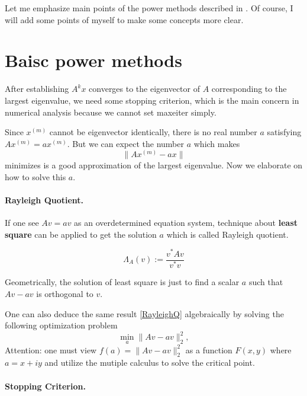 \documentclass[12pt]{article}
\begin{document}
Let me emphasize main points of the power methods described in \cite{borm2012numerical}.
Of course, I will add some points of myself to make some concepts more clear.


\section{Baisc power methods}
After establishing $A^{k}x$ converges to the eigenvector of $A$ corresponding to the largest eigenvalue, 
we need some stopping criterion, which is the main concern in numerical analysis because we cannot set max\textunderscore eiter simply. 

Since $x^{(m)}$ cannot be eigenvector identically, there is no real number $a$ satisfying $Ax^{(m)} = ax^{(m)}$. 
But we can expect the number $a$ which makes
$$
\|A x^{(m)}-ax\| 
$$
minimizes is a good approximation of the largest eigenvalue. Now we elaborate on how to solve this $a$.

\paragraph{Rayleigh Quotient.} If one see $Av = av$ as an overdetermined equation system, technique about \textbf{least square} can be applied
to get the solution $a$ which is called Rayleigh quotient.

\begin{equation}
    \label{RayleighQ}
    \Lambda_{A}(v) := \frac{v^{*}Av}{v^{*}v}
\end{equation}

Geometrically, the solution of least square is just to find a scalar $a$ such that $Av-av$ is orthogonal to $v$.

\begin{tcolorbox}[colback=gray!10, colframe=black, title=Rayleigh quotient]
    One can also deduce the same result \eqref{RayleighQ} algebraically by solving the following optimization problem
    \begin{equation}
        \label{optimization1}
        \operatorname{min}_{a} \|Av-a v\|_{2}^{2},
    \end{equation}
    Attention: one must view $f(a) = \|Av-av\|_{2}^{2}$ as a function $F(x,y)$ where $a=x+iy$ and 
    utilize the mutiple calculus to solve the critical point. 
    \end{tcolorbox}


\paragraph{Stopping Criterion.}
\end{document}
